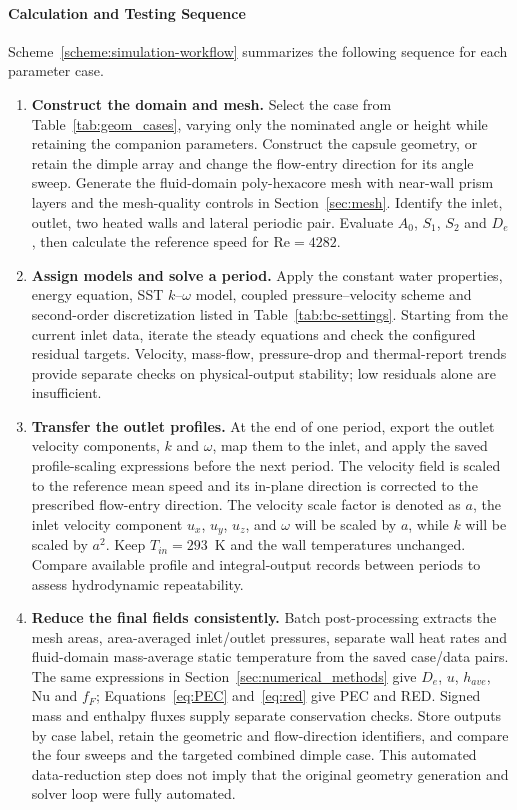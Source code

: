 \paragraph{Calculation and Testing Sequence}
Scheme~\ref{scheme:simulation-workflow} summarizes the following sequence for each parameter case.
\begin{enumerate}
  \item \textbf{Construct the domain and mesh.} Select the case from Table~\ref{tab:geom_cases}, varying only the nominated angle or height while retaining the companion parameters. Construct the capsule geometry, or retain the dimple array and change the flow-entry direction for its angle sweep. Generate the fluid-domain poly-hexacore mesh with near-wall prism layers and the mesh-quality controls in Section~\ref{sec:mesh}. Identify the inlet, outlet, two heated walls and lateral periodic pair. Evaluate $A_0$, $S_1$, $S_2$ and $D_e$, then calculate the reference speed for $\mathrm{Re}=4282$.
  \item \textbf{Assign models and solve a period.} Apply the constant water properties, energy equation, SST $k$--$\omega$ model, coupled pressure--velocity scheme and second-order discretization listed in Table~\ref{tab:bc-settings}. Starting from the current inlet data, iterate the steady equations and check the configured residual targets. Velocity, mass-flow, pressure-drop and thermal-report trends provide separate checks on physical-output stability; low residuals alone are insufficient.
  \item \textbf{Transfer the outlet profiles.} At the end of one period, export the outlet velocity components, $k$ and $\omega$, map them to the inlet, and apply the saved profile-scaling expressions before the next period. The velocity field is scaled to the reference mean speed and its in-plane direction is corrected to the prescribed flow-entry direction. The velocity scale factor is denoted as $a$, the inlet velocity component $u_x$, $u_y$, $u_z$, and $\omega$ will be scaled by $a$, while $k$ will be scaled by $a^2$. Keep $T_{in}=293$~K and the wall temperatures unchanged. Compare available profile and integral-output records between periods to assess hydrodynamic repeatability.
  \item \textbf{Reduce the final fields consistently.} Batch post-processing extracts the mesh areas, area-averaged inlet/outlet pressures, separate wall heat rates and fluid-domain mass-average static temperature from the saved case/data pairs. The same expressions in Section~\ref{sec:numerical_methods} give $D_e$, $u$, $h_{ave}$, Nu and $f_F$; Equations~\eqref{eq:PEC} and~\eqref{eq:red} give PEC and RED. Signed mass and enthalpy fluxes supply separate conservation checks. Store outputs by case label, retain the geometric and flow-direction identifiers, and compare the four sweeps and the targeted combined dimple case. This automated data-reduction step does not imply that the original geometry generation and solver loop were fully automated.
\end{enumerate}

